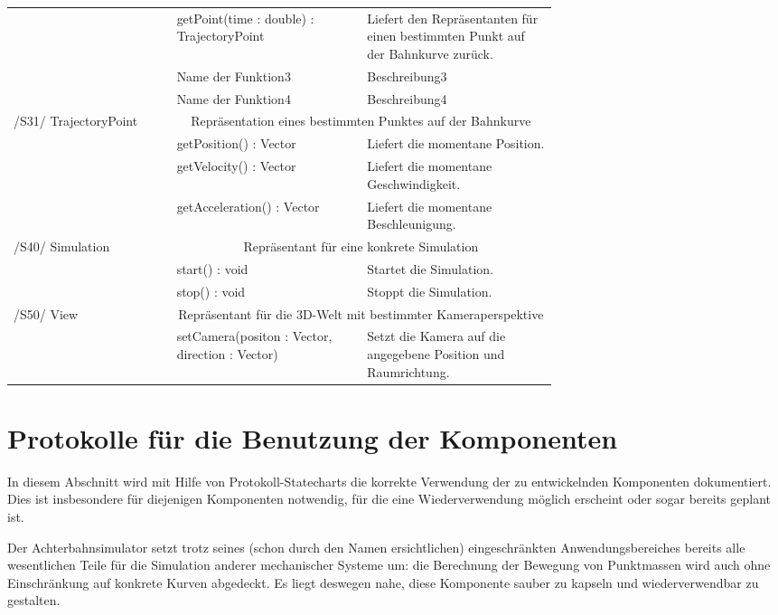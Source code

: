\begin{tabular}[ht]{|l|p{0.35\linewidth}|p{0.35\linewidth}|}
 & getPoint(time : double) : TrajectoryPoint & Liefert den Repräsentanten für einen bestimmten Punkt auf der Bahnkurve zurück.\\ 
 & Name der Funktion3 & Beschreibung3\\ 
 & Name der Funktion4 & Beschreibung4\\ 
 \hline
 	/S31/ TrajectoryPoint & \multicolumn{2}{|c|}{Repräsentation eines bestimmten Punktes auf der Bahnkurve}\\
 \hline
 & getPosition() : Vector & Liefert die momentane Position.\\ 
 & getVelocity() : Vector & Liefert die momentane Geschwindigkeit.\\ 
 & getAcceleration() : Vector & Liefert die momentane Beschleunigung. \\ 
 \hline
    /S40/ Simulation & \multicolumn{2}{|c|}{Repräsentant für eine konkrete Simulation}\\
 \hline
 & start() : void & Startet die Simulation.\\ 
 & stop() : void & Stoppt die Simulation. \\ 
\hline
	/S50/ View & \multicolumn{2}{|c|}{Repräsentant für die 3D-Welt mit bestimmter Kameraperspektive}\\
\hline
 & setCamera(positon : Vector, direction : Vector) & Setzt die Kamera auf die angegebene Position und Raumrichtung. \\ 
 \hline
 \end{tabular}





\section{Protokolle für die Benutzung der Komponenten}

In diesem Abschnitt wird mit Hilfe von Protokoll-Statecharts die korrekte
Verwendung der zu entwickelnden Komponenten dokumentiert. Dies ist insbesondere
für diejenigen Komponenten notwendig, für die eine Wiederverwendung möglich
erscheint oder sogar bereits geplant ist.


Der Achterbahnsimulator setzt trotz seines (schon durch den Namen ersichtlichen)
eingeschränkten Anwendungsbereiches bereits alle wesentlichen Teile für die
Simulation anderer mechanischer Systeme um: die Berechnung der Bewegung von
Punktmassen wird auch ohne Einschränkung auf konkrete Kurven abgedeckt. Es liegt
deswegen nahe, diese Komponente sauber zu kapseln und wiederverwendbar zu gestalten.

